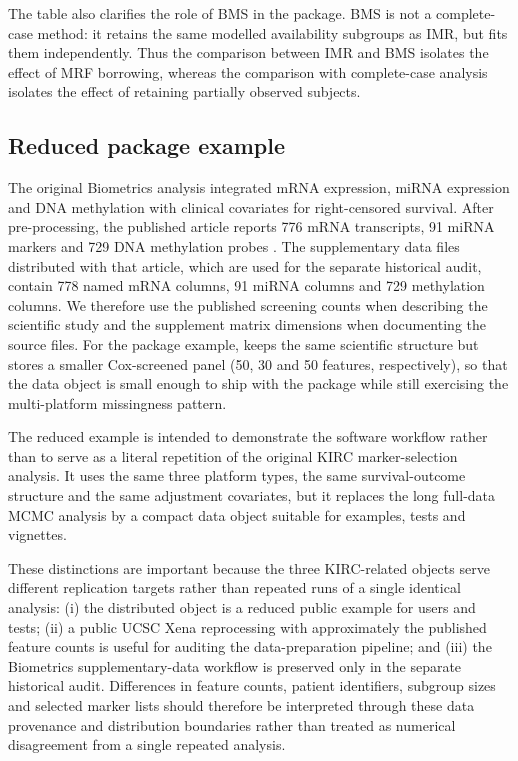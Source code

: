 \documentclass[article]{jss}
\begin{document}
The table also clarifies the role of BMS in the package.  BMS is not a
complete-case method: it retains the same modelled availability subgroups as
IMR, but fits them independently.  Thus the comparison between IMR and BMS
isolates the effect of MRF borrowing, whereas the comparison with complete-case
analysis isolates the effect of retaining partially observed subjects.

\subsection{Reduced package example}\label{sec:kirc}

The original Biometrics analysis integrated mRNA expression, miRNA expression
and DNA methylation with clinical covariates for right-censored survival.  After
pre-processing, the published article reports 776 mRNA transcripts, 91 miRNA
markers and 729 DNA methylation probes \citep{chekouo2017}.  The supplementary
 data files distributed with that article, which are used for the
separate historical audit, contain 778 named
mRNA columns, 91 miRNA columns and 729 methylation columns.  We therefore use
the published screening counts when describing the scientific study and the
supplement matrix dimensions when documenting the source files.  For the
package example,  keeps the same scientific structure but stores
a smaller Cox-screened panel (50, 30 and 50 features, respectively), so that the
data object is small enough to ship with the package while still exercising the
multi-platform missingness pattern.

The reduced example is intended to demonstrate the software workflow rather
than to serve as a literal repetition of the original KIRC marker-selection
analysis.  It uses the same three platform types, the same survival-outcome
structure and the same adjustment covariates, but it replaces the long
full-data MCMC analysis by a compact data object suitable for examples, tests
and vignettes.

These distinctions are important because the three KIRC-related objects serve
different replication targets rather than repeated runs of a single identical
analysis: (i) the distributed  object is a reduced public example
for users and tests; (ii) a public UCSC Xena reprocessing with approximately the
published feature counts is useful for auditing the data-preparation pipeline;
and (iii) the Biometrics supplementary-data workflow is preserved only in the
separate historical audit.  Differences in
feature counts, patient identifiers, subgroup sizes and selected marker lists
should therefore be interpreted through these data provenance and distribution
boundaries rather than treated as numerical disagreement from a single
repeated analysis.
\end{document}
